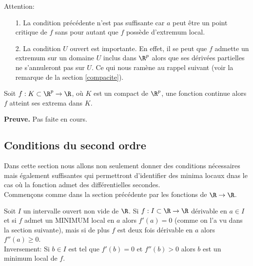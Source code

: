 \documentclass[12pt, class=report,crop=false]{standalone}
\begin{document}
{\begin{remarque*}
\textcolor[rgb]{0.00,0.00,1.00}{
  Attention: 
  \begin{itemize}
  \item[1.]La condition précédente n'est pas suffisante car 
  $a$ peut être un point critique de $f$ sans pour autant que $f$ possède d'extremum local. 
  \item[2.] La condition $U$ ouvert est importante. En effet, il se peut 
  que $f$ admette un extremum sur un domaine $U$ inclus dans $\R^p$
  alors que ses dérivées partielles ne s'annuleront pas sur $U$. Ce qui nous ramène au rappel suivant (voir la remarque de la section \ref{compacite}).
  \end{itemize}}
  \end{remarque*}
  


\begin{proposition}
\textcolor[rgb]{0.44,0.00,0.87}{
  Soit $f:K\subset \R^p \rightarrow \R$, où $K$ est un compact de $\R^p$, une fonction continue alors $f$ atteint ses extrema dans $K$.}
\end{proposition}



{\textbf{Preuve.}} Pas faite en cours.

\subsection{Conditions du second ordre}

\noindent Dans cette section nous allons non seulement donner des conditions nécessaires mais également suffisantes qui permettront
d'identifier des minima locaux dnas le cas où la fonction admet des différentielles secondes.\\
$ $
\\
Commençons comme dans la section précédente par les fonctions de $\R \rightarrow \R$.


\begin{proposition}
\textcolor[rgb]{0.44,0.00,0.87}{
 Soit $I$ un intervalle ouvert non vide de $\R$. Si $f: I \subset \R \rightarrow \R$ dérivable en $a \in I$
et si $f$ admet un MINIMUM local en $a$ alors $f'(a)=0$ (comme on l'a vu dans la section suivante), mais si de plus $f$ est deux fois 
dérivable en $a$ alors $f''(a) \geq 0$.\\
Inversement: Si $b \in I$ est tel que $f'(b)=0$ et $f''(b)>0$ alors $b$ est un minimum  local de $f$. }
\end{proposition}






}
\end{document}
